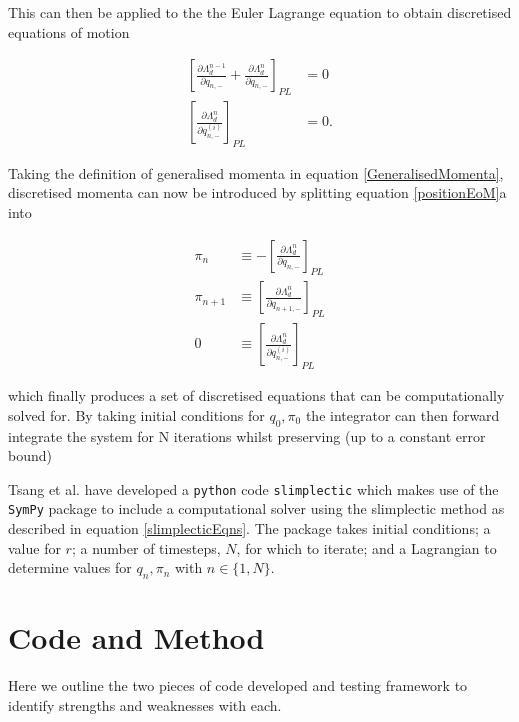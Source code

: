 \documentclass[10pt]{iopart}
\begin{document}
This can then be applied to the the Euler Lagrange equation to obtain discretised equations of motion


\begin{subequations}
\label{positionEoM}
\begin{align}
		\left[\frac{\partial \Lambda_d^{n-1}}{\partial q_{n,-}} + \frac{\partial\Lambda_d^n}{\partial q_{n,-}}\right]_{PL} &= 0 \\
	\left[\frac{\partial\Lambda_d^n}{\partial q_{n,-}^{(i)}}\right]_{PL} &= 0.
\end{align}
\end{subequations}

Taking the definition of generalised momenta in equation \ref{GeneralisedMomenta}, discretised momenta can now be introduced by splitting equation \ref{positionEoM}a into 

\begin{subequations}
\label{slimplecticEqns}
\begin{align}
\pi_n &\equiv -\left[\frac{\partial\Lambda_d^n}{\partial q_{n,-}}\right]_{PL} \\
\pi_{n+1} &\equiv \left[\frac{\partial\Lambda_d^n}{\partial q_{n+1,-}}\right]_{PL} \\ 
0 &\equiv \left[\frac{\partial\Lambda_d^n}{\partial q_{n,-}^{(i)}}\right]_{PL}
\end{align}
\end{subequations}

which finally produces a set of discretised equations that can be computationally solved for. By taking initial conditions for $q_0, \pi_0$ the integrator can then forward integrate the system for N iterations whilst preserving (up to a constant error bound) 

Tsang et al. \cite{Tsang_Slimplectic} have developed a \texttt{python} code \texttt{slimplectic} which makes use of the \texttt{SymPy} package to include a computational solver using the slimplectic method as described in equation \ref{slimplecticEqns}. The package takes initial conditions; a value for $r$; a number of timesteps, $N$, for which to iterate; and a Lagrangian to determine values for $q_n,\pi_n$ with $n\in\{1,N\}$.


\section{Code and Method}
Here we outline the two pieces of code developed and testing framework to identify strengths and weaknesses with each. 
\end{document}
